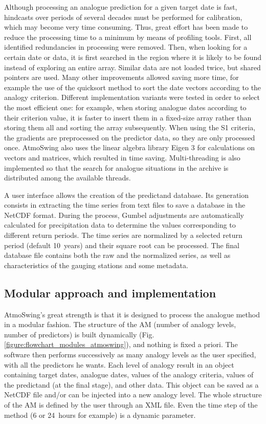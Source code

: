 \documentclass[review]{elsarticle}
\begin{document}
Although processing an analogue prediction for a given target date is fast, hindcasts over periods of several decades must be performed for calibration, which may become very time consuming. Thus, great effort has been made to reduce the processing time to a minimum by means of profiling tools. First, all identified redundancies in processing were removed. Then, when looking for a certain date or data, it is first searched in the region where it is likely to be found instead of exploring an entire array. Similar data are not loaded twice, but shared pointers are used. Many other improvements allowed saving more time, for example the use of the quicksort method \citep{Hoare1962a} to sort the date vectors according to the analogy criterion. Different implementation variants were tested in order to select the most efficient one: for example, when storing analogue dates according to their criterion value, it is faster to insert them in a fixed-size array rather than storing them all and sorting the array subsequently. When using the S1 criteria, the gradients are preprocessed on the predictor data, so they are only processed once. AtmoSwing also uses the linear algebra library Eigen 3 \citep{Guennebaud2010} for calculations on vectors and matrices, which resulted in time saving. Multi-threading is also implemented so that the search for analogue situations in the archive is distributed among the available threads.

A user interface allows the creation of the predictand database. Its generation consists in extracting the time series from text files to save a database in the NetCDF format. During the process, Gumbel adjustments are automatically calculated for precipitation data to determine the values corresponding to different return periods. The time series are normalized by a selected return period (default 10~years) and their square root can be processed. The final database file contains both the raw and the normalized series, as well as characteristics of the gauging stations and some metadata.


\subsection{Modular approach and implementation}

AtmoSwing's great strength is that it is designed to process the analogue method in a modular fashion. The structure of the AM (number of analogy levels, number of predictors) is built dynamically (Fig. \ref{figure:flowchart_modules_atmoswing}), and nothing is fixed a priori. The software then performs successively as many analogy levels as the user specified, with all the predictors he wants. Each level of analogy result in an object containing target dates, analogue dates, values of the analogy criteria, values of the predictand (at the final stage), and other data. This object can be saved as a NetCDF file and/or can be injected into a new analogy level. The whole structure of the AM is defined by the user through an XML file. Even the time step of the method (6 or 24~hours for example) is a dynamic parameter.
\end{document}

